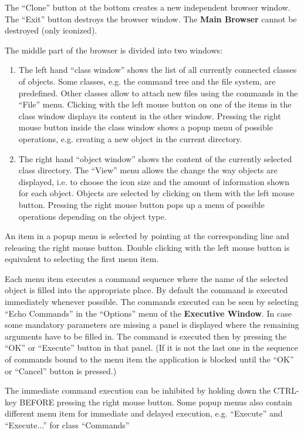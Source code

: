 \documentclass[11pt]{cernman}
\newcommand{\MB}{{\bf Main Browser}\index{Main Browser}}
\newcommand{\EW}{{\bf Executive Window}\index{Executive Window}}
\begin{document}
The ``Clone'' button at the bottom creates a new independent browser window.
The ``Exit'' button destroys the browser window. The \MB{} cannot be
destroyed (only iconized).

The middle part of the browser is divided into two windows:

\begin{enumerate}
\item The left hand ``class window'' shows the list of all currently connected
   classes of objects.  Some classes, e.g. the command tree and the file
   system, are predefined.  Other classes allow to attach new files using the
   commands in the ``File'' menu.  Clicking with the left mouse button on
   one of
   the items in the class window displays its content in the other window.
   Pressing the right mouse button inside the class window shows a popup menu
   of possible operations, e.g. creating a new object in the current
   directory.

\item The right hand ``object window'' shows the content of the currently
   selected class directory.  The ``View'' menu allows the change the way
   objects are displayed, i.e. to choose the icon size and the amount of
   information shown for each object.  Objects are selected by clicking on
   them with the left mouse button.  Pressing the right mouse button pops up a
   menu of possible operations depending on the object type.
\end{enumerate}

   An item in a popup menu is selected by pointing at the corresponding line
   and releasing the right mouse button.  Double clicking with the left mouse
   button is equivalent to selecting the first menu item.

   Each menu item executes a command sequence where the name of the selected
   object is filled into the appropriate place.  By default the command is
   executed immediately whenever possible. The commands executed can be seen
   by selecting ``Echo Commands'' in the ``Options'' menu of the \EW.
   In case some mandatory parameters are missing a panel is displayed
   where the remaining arguments have to be filled in.  The command is
   executed then by pressing the ``OK'' or ``Execute'' button in that panel.
   (If it is not the last one in the sequence of commands bound to the menu item
   the application is blocked until the ``OK'' or ``Cancel'' button is pressed.)

   The immediate command execution can be inhibited by holding down the
   CTRL-key BEFORE pressing the right mouse button.  Some popup menus also
   contain different menu item for immediate and delayed execution, e.g.
   ``Execute'' and ``Execute...'' for class ``Commands''
\end{document}
